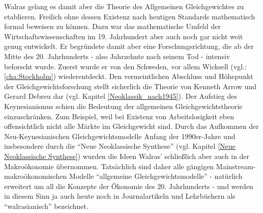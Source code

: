 Walras gelang es damit aber die Theorie des Allgemeinen Gleichgewichtes zu etablieren. Freilich ohne dessen Existenz nach heutigen Standards mathematisch formal beweisen zu können. Dazu war das mathematische Umfeld der Wirtschaftswissenschaften im 19. Jahrhundert aber auch noch gar nicht weit genug entwickelt. Er begründete damit aber eine Forschungsrichtung, die ab der Mitte des 20. Jahrhunderts - also Jahrzehnte nach seinem Tod - intensiv beforscht wurde. Zuerst wurde er von den Schweden, vor allem Wicksell (vgl.: \ref{cha:Stockholm}) wiederentdeckt. Den vermeintlichen Abschluss und Höhepunkt der Gleichgewichtsforschung  stellt sicherlich die Theorie von Kenneth Arrow und Gerard Debreu dar (vgl. Kapitel \ref{Neoklassik_nach1945}). Der Aufstieg des Keynesianismus schien die Bedeutung der allgemeinen Gleichgewichtstheorie einzuschränken. Zum Beispiel, weil bei Existenz von Arbeitslosigkeit eben offensichtlich nicht alle Märkte im Gleichgewicht sind. Durch das Aufkommen der Neu-Keynesianischen Gleichgewichtsmodelle Anfang der 1990er-Jahre und insbesondere durch die "`Neue Neoklassische Synthese"' (vgl. Kapitel \ref{Neue Neoklassische Synthese}) wurden die Ideen Walras' schließlich aber auch in der Makroökonomie übernommen. Tatsächlich sind daher alle gängigen Mainstream-makroökonomischen Modelle  "`allgemeine Gleichgewichtsmodelle"' - natürlich erweitert um all die Konzepte der Ökonomie des 20. Jahrhunderts - und werden in diesem Sinn ja auch heute noch in Journalartikeln und Lehrbüchern als "`walrasianisch"' bezeichnet.